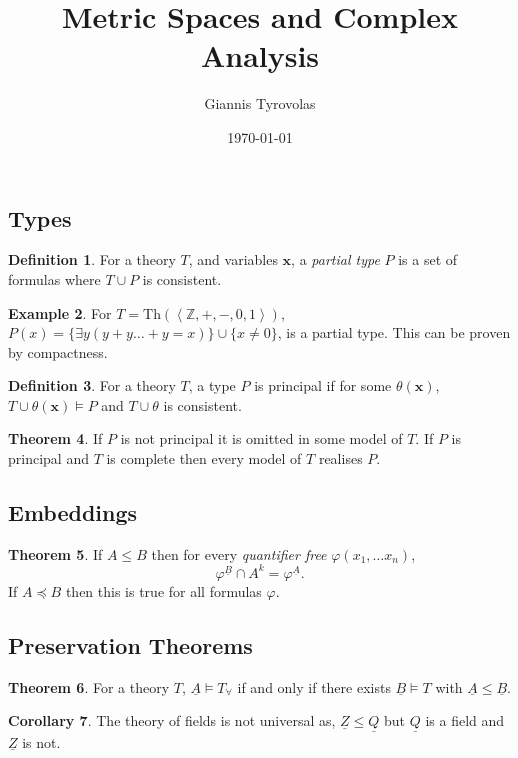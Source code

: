 \documentclass[a4paper,10pt]{article}
\title{Metric Spaces and Complex Analysis}
\author{Giannis Tyrovolas}
\date{\today}
\theoremstyle{definition}
\newtheorem{theorem}{Theorem}
\newtheorem{definition}[theorem]{Definition}
\newtheorem{example}[theorem]{Example}
\newtheorem{corollary}[theorem]{Corollary}
\let\vec\mathbf
\begin{document}
\subsection*{Types}

\begin{definition}
    For a theory $T$, and variables $\vec{x}$, a \emph{partial type} $P$ is a set of formulas where $T \cup P$ is consistent.
\end{definition}

\begin{example}
    For $T = \text{Th}(\left\langle \mathbb{Z}, +, -, 0, 1\right\rangle )$, $P(x) = \{\exists y(y + y \ldots +y = x)\} \cup \{x \neq 0\}$, is a partial type. This can be proven by compactness.
\end{example}

\begin{definition}
    For a theory $T$, a type $P$ is principal if for some $\theta(\vec{x})$, $T\cup \theta(\vec{x}) \models P$ and $T \cup \theta$ is consistent.
\end{definition} 

\begin{theorem}
    If $P$ is not principal it is omitted in some model of $T$. If $P$ is principal and $T$ is complete then every model of $T$ realises $P$.
\end{theorem}

\subsection*{Embeddings}

\begin{theorem}
    If $A \leqslant B$ then for every \emph{quantifier free} $\varphi(x_1, \ldots x_n)$, 
    \[\varphi ^ {\underline{B}} \cap A^k = \varphi ^ {\underline{A}}.\]
    If $A \preceq B$ then this is true for all formulas $\varphi$.
\end{theorem}

\subsection*{Preservation Theorems}

\begin{theorem}
    For a theory $T$, $\underline{A} \models T_{\forall}$ if and only if there exists $\underline{B} \models T$ with $\underline{A}  \leqslant \underline{B}$. 
\end{theorem}

\begin{corollary}
    The theory of fields is not universal as, $\underline{Z} \leqslant \underline{Q}$ but $\underline{Q}$ is a field and $\underline{Z}$ is not.
\end{corollary}
\end{document}
